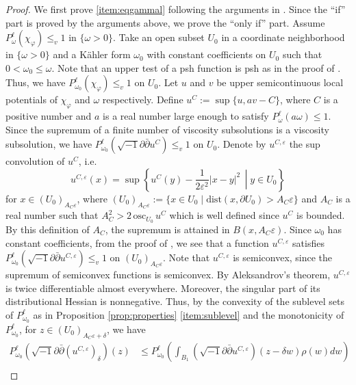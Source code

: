 \documentclass{amsart}
\numberwithin{equation}{section}
\theoremstyle{plain}
\theoremstyle{definition}
\theoremstyle{remark}
\newcommand{\delb}{\sqrt{-1}\partial\bar{\partial}}
\newcommand{\relmiddle}[1]{\mathrel{}\middle#1\mathrel{}}
\begin{document}
    \begin{proof}
        We first prove \ref{item:eqgammal} following the arguments in \cite[Proposition 1.11 and Theorem 1.9]{EGZ}. Since the ``if'' part is proved by the arguments above, we prove the ``only if'' part. Assume $P^\ell_\omega(\chi_\varphi)\le_v 1$ in $\{\omega>0\}$.
        Take an open subset $U_0$ in a coordinate neighborhood in $\{\omega>0\}$ and a K{\"a}hler form $\omega_0$ with constant coefficients on $U_0$ such that $0<\omega_0\le\omega$. Note that an upper test of a psh function is psh as in the proof of \cite[Proposition 1.3]{EGZ}. Thus, we have $P^\ell_{\omega_0}(\chi_\varphi)\le_v 1$ on $U_0$. Let $u$ and $v$ be upper semicontinuous local potentials of $\chi_\varphi$ and $\omega$ respectively. Define $u^C:=\sup\{u,av-C\}$, where $C$ is a positive number and $a$ is a real number large enough to satisfy $P^\ell_\omega(a\omega)\le 1$. Since the supremum of a finite number of viscosity subsolutions is a viscosity subsolution, we have $P^\ell_{\omega_0}(
        \delb u^C)\le_v 1$ on $U_0$. Denote by $u^{C,\varepsilon}$ the sup convolution of $u^C$, i.e.
        $$u^{C,\varepsilon}(x) = \sup \left\{ u^C(y)-\frac{1}{2\varepsilon^2}|x-y|^2 \, \relmiddle{|} y \in U_0 \right\}$$
        for $x\in (U_0)_{A_C \varepsilon}$, where $(U_0)_{A_C \varepsilon}:=\{x\in U_0\mid \mathrm{dist}(x,\partial U_0)>A_C \varepsilon\}$ and $A_C$ is a real number such that $A_C^2>2\, \mathrm{osc}_{U_0} \, u^C$ which is well defined since $u^C$ is bounded. By this definition of $A_C$, the supremum is attained in $B(x, A_C \varepsilon)$.
        Since $\omega_0$ has constant coefficients, from the proof of \cite[Proposition 4.2]{Ishii}, we see that a function $u^{C,\varepsilon}$ satisfies $P^\ell_{\omega_0}(\delb u^{C,\varepsilon})\le_v 1$ on $(U_0)_{A_C\varepsilon}$.
        Note that $u^{C,\varepsilon}$ is semiconvex, since the supremum of semiconvex functions is semiconvex. By Aleksandrov's theorem, $u^{C,\varepsilon}$ is twice differentiable almost everywhere. Moreover, the singular part of its distributional Hessian is nonnegative. Thus, by the convexity of the sublevel sets of $P^\ell_{\omega_0}$ as in Proposition \ref{prop:properties} \ref{item:sublevel} and the monotonicity of $P^\ell_{\omega_0}$, for $z \in (U_0)_{A_C\varepsilon+\delta}$, we have
        \begin{equation}\label{eq:supconv}
        \begin{aligned}
        P^\ell_{\omega_0}(\delb(u^{C,\varepsilon})_\delta) (z)&\le P^\ell_{\omega_0}\left(\int_{B_1} (\delb u^{C,\varepsilon})(z-\delta w)\rho(w)dw\right)\\

\end{aligned}
\end{equation}
\end{proof}
\end{document}
